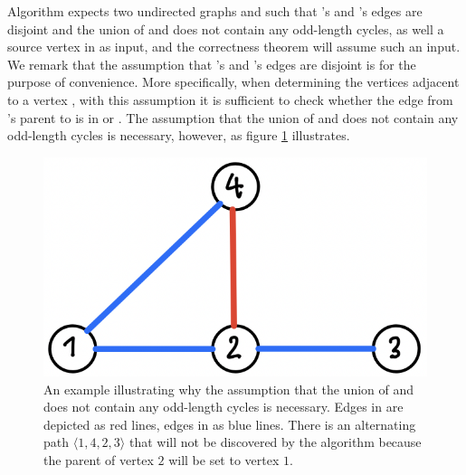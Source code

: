 \begin{isabellebody}
\isanewline
{}\isamarkupfalse%
%
\isadelimdocument
%
\endisadelimdocument
%
\isatagdocument
%
\isamarkuptrue%
%
\isamarkuptrue%
%
\endisatagdocument
{\isafolddocument}%
%
\isadelimdocument
%
\endisadelimdocument
%
\begin{isamarkuptext}%
Algorithm  expects two undirected graphs  and  such that
's and 's edges are disjoint and the union of  and  does not
contain any odd-length cycles, as well a source vertex  in  as input, and the
correctness theorem will assume such an input. We remark that the assumption that 's and
's edges are disjoint is for the purpose of convenience. More specifically, when
determining the vertices adjacent to a vertex , with this assumption it is sufficient to
check whether the edge from 's parent to  is in  or . The assumption that the union of  and  does not contain any odd-length cycles is necessary, however, as figure \ref{fig:2} illustrates.

\begin{figure}
    \centering
    \includegraphics[scale=0.5]{../figures/Screen Shot 2022-06-26 at 23.59.08}
    \caption{An example illustrating why the assumption that the union of  and  does not contain any odd-length cycles is necessary. Edges in  are depicted as red lines, edges in  as blue lines. There is an alternating path $\langle 1,4,2,3\rangle$ that will not be discovered by the algorithm because the parent of vertex $2$ will be set to vertex $1$.}
    \label{fig:2}
\end{figure}


\end{isamarkuptext}
\end{isabellebody}
